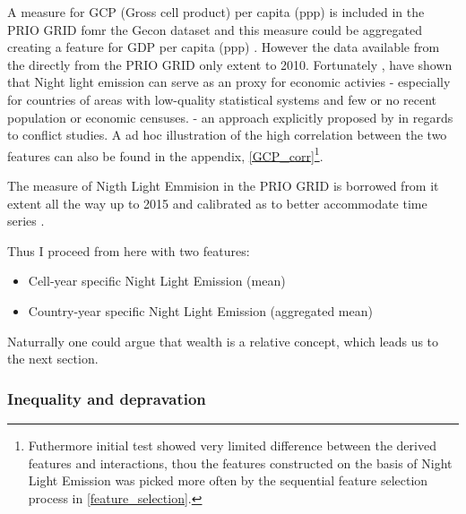\documentclass[a4paper]{article}
\begin{document}
 A measure for GCP (Gross cell product) per capita (ppp) is included in the PRIO GRID fomr the Gecon dataset \citep{Nordhaus_2006} and this measure could be aggregated creating a feature for GDP per capita (ppp) \citep{prio_code_2015}. However the data available from the directly from the PRIO GRID only extent to 2010. Fortunately \cite{Elvidge_2009}, \cite{Chen_Nordhuas_2011} have shown that Night light emission can serve as an proxy for economic activies - especially for countries of areas with low-quality statistical systems and few or no recent population or economic censuses. \citep{Chen_Nordhuas_2011} - an approach explicitly proposed by \cite[p. 101]{Cederman_Gleditsch_Buhaug_2013} in regards to conflict studies. A ad hoc illustration of the high correlation between the two features can also be found in the appendix, \autoref{GCP_corr}\footnote{Futhermore initial test showed very limited difference between the derived features and interactions, thou the features constructed on the basis of Night Light Emission was picked more often by the sequential feature selection process in \autoref{feature_selection}.}.\par
 
 The measure of Nigth Light Emmision in the PRIO GRID is borrowed from \cite{Elvidge_2014}it extent all the way up to 2015 and calibrated as to better accommodate time series \cite{prio_code_2015}.\par %
 
 Thus I proceed from here with two features:
 
 \begin{itemize}
     \item Cell-year specific Night Light Emission (mean)
     \item Country-year specific Night Light Emission (aggregated mean) 
 \end{itemize}

Naturrally one could argue that wealth is a relative concept, which leads us to the next section.

\subsubsection{Inequality and depravation} %
\end{document}
